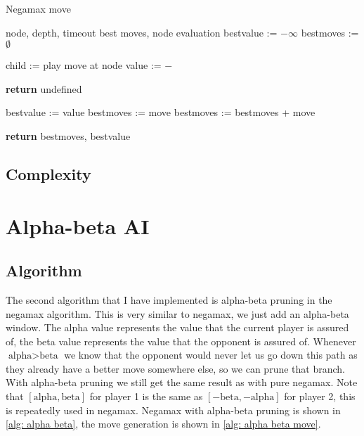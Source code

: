 \documentclass[a4paper]{article}
\begin{document}
\begin{algorithm}
	\caption{Negamax move}
	\label{alg: negamax move}
	\begin{algorithmic}[1]
		\Require node, depth, timeout
		\Ensure best moves, node evaluation
			\State bestvalue := $-\infty$
			\State bestmoves := $\emptyset$

				\State child := play move at node
				\State value := $-$

					\State \textbf{return} undefined
				\EndIf

					\State bestvalue := value
					\State bestmoves := move
					\State bestmoves := bestmoves + move
				\EndIf
			\EndFor

			\State \textbf{return} bestmoves, bestvalue
		\EndFunction
	\end{algorithmic}
\end{algorithm}

\subsection{Complexity}

\section{Alpha-beta AI}

\subsection{Algorithm}
The second algorithm that I have implemented is alpha-beta pruning in the
negamax algorithm. This is very similar to negamax, we just add an alpha-beta
window. The alpha value represents the value that the current player is assured
of, the beta value represents the value that the opponent is assured of.
Whenever $\text{alpha} > \text{beta}$ we know that the opponent would never let
us go down this path as they already have a better move somewhere else, so we
can prune that branch. With alpha-beta pruning we still get the same result as
with pure negamax. Note that $[\text{alpha}, \text{beta}]$ for player 1 is the
same as $[-\text{beta}, -\text{alpha}]$ for player 2, this is repeatedly used
in negamax. Negamax with alpha-beta pruning is shown in \ref{alg: alpha beta},
the move generation is shown in \ref{alg: alpha beta move}.
\end{document}
